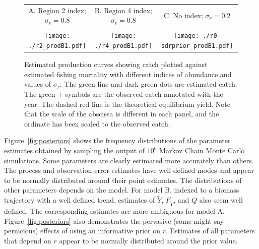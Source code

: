 \documentclass[12pt,letterpaper]{article}
\newcommand\MSY{\widetilde{Y}}
\newcommand\Fmsy{F_{\MSY}}
\begin{document}
\begin{figure}
\begin{center}
{\scriptsize \sffamily
\begin{tabular}{ccc}
A. Region 2 index; $\sigma_r=0.8$ &
B. Region 4 index; $\sigma_r=0.8$ &
C. No index; $\sigma_r=0.2$ \\
\\
\texttt{[image: ./r2\_prodB1.pdf]} &
\texttt{[image: ./r4\_prodB1.pdf]} &
\texttt{[image: ./r0-sdrprior\_prodB1.pdf]}\\
\end{tabular}
}
\caption{Estimated production curves showing catch plotted against
estimated fishing mortality with different indices of abundance
and values of $\sigma_r$.
The green line and dark green dots are estimated catch.
The green $+$ symbols are the observed catch annotated with the year.
The dashed red line is the theoretical equilibrium yield.
Note that the scale of the abscissa is different in each panel, and
the ordinate has been scaled to the observed catch.
\label{fig:estprod}}
\end{center}
\end{figure}


Figure~\ref{fig:posteriors} shows the frequency distributions of the
parameter estimates obtained by sampling the output of $10^6$ Markov
Chain Monte Carlo simulations. Some parameters are clearly estimated
more accurately than others. The process and observation error
estimates have well defined modes and appear to be normally
distributed around their point estimates. The distributions of other
parameters depends on the model. For model B, indexed to a
biomass trajectory with a well defined trend, estimates of $\MSY$,
$\Fmsy$, and $Q$ also seem well defined.
The corresponding estimates are more ambiguous for model A.
Figure~\ref{fig:posteriors} also demonstrates the pervasive (some
might say pernicious) effects of using an informative prior on $r$. Estimates
of all parameters that depend on $r$ appear to be normally
distributed around the prior value.
\end{document}
